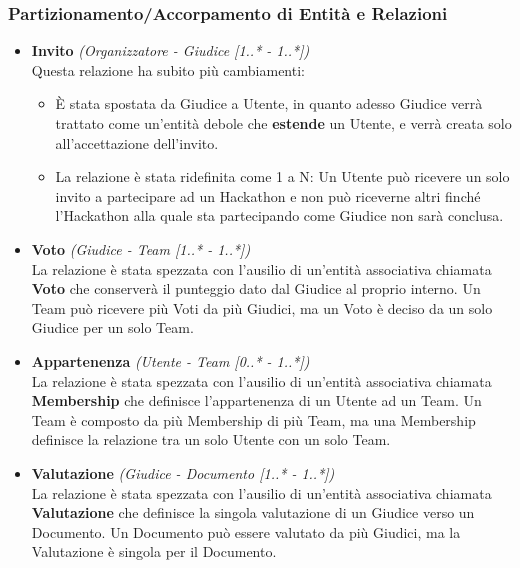 \documentclass[a4paper, 10pt]{article}
\begin{document}
	\subsubsection{Partizionamento/Accorpamento di Entità e Relazioni}
	\begin{itemize}
		\item \textbf{Invito} \textit{(Organizzatore - Giudice [1..* - 1..*])}\\Questa relazione ha subito più cambiamenti:
		\begin{itemize}
			\item È stata spostata da Giudice a Utente, in quanto adesso Giudice verrà trattato come un'entità debole che \textbf{estende} un Utente, e verrà creata solo all'accettazione dell'invito.
			\item La relazione è stata ridefinita come 1 a N: Un Utente può ricevere un solo invito a partecipare ad un Hackathon e non può riceverne altri finché l'Hackathon alla quale sta partecipando come Giudice non sarà conclusa.
		\end{itemize}
		\item \textbf{Voto} \textit{(Giudice - Team [1..* - 1..*])}\\La relazione è stata spezzata con l'ausilio di un'entità associativa chiamata \textbf{Voto} che conserverà il punteggio dato dal Giudice al proprio interno. Un Team può ricevere più Voti da più Giudici, ma un Voto è deciso da un solo Giudice per un solo Team.
		\item \textbf{Appartenenza} \textit{(Utente - Team [0..* - 1..*])}\\La relazione è stata spezzata con l'ausilio di un'entità associativa chiamata \textbf{Membership} che definisce l'appartenenza di un Utente ad un Team. Un Team è composto da più Membership di più Team, ma una Membership definisce la relazione tra un solo Utente con un solo Team.
		\item \textbf{Valutazione} \textit{(Giudice - Documento [1..* - 1..*])}\\La relazione è stata spezzata con l'ausilio di un'entità associativa chiamata \textbf{Valutazione} che definisce la singola valutazione di un Giudice verso un Documento. Un Documento può essere valutato da più Giudici, ma la Valutazione è singola per il Documento.
	\end{itemize}
\end{document}
